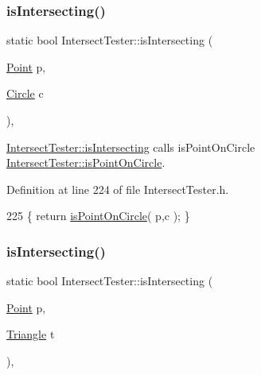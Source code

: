 \subsubsection{\texorpdfstring{is\+Intersecting()}{isIntersecting()}\hspace{0.1cm}{\footnotesize\ttfamily [3/15]}}
{\footnotesize\ttfamily static bool Intersect\+Tester\+::is\+Intersecting (\begin{DoxyParamCaption}\item[{\hyperlink{class_point}{Point}}]{p,  }\item[{\hyperlink{class_circle}{Circle}}]{c }\end{DoxyParamCaption})\hspace{0.3cm}{\ttfamily [inline]}, {\ttfamily [static]}}



\hyperlink{class_intersect_tester_a7710e17ff7d2e229059f23b9429213f5}{Intersect\+Tester\+::is\+Intersecting} calls is\+Point\+On\+Circle  \hyperlink{class_intersect_tester_a1adb6abbf2f6454b48be18cf5eb69333}{Intersect\+Tester\+::is\+Point\+On\+Circle}. 



Definition at line 224 of file Intersect\+Tester.\+h.


\begin{DoxyCode}
225     \{ \textcolor{keywordflow}{return} \hyperlink{class_intersect_tester_a1adb6abbf2f6454b48be18cf5eb69333}{isPointOnCircle}( p,c ); \}
\end{DoxyCode}
\mbox{\label{class_intersect_tester_afd66862467239ef2fd7c79114c960dc6}} 
\subsubsection{\texorpdfstring{is\+Intersecting()}{isIntersecting()}\hspace{0.1cm}{\footnotesize\ttfamily [4/15]}}
{\footnotesize\ttfamily static bool Intersect\+Tester\+::is\+Intersecting (\begin{DoxyParamCaption}\item[{\hyperlink{class_point}{Point}}]{p,  }\item[{\hyperlink{class_triangle}{Triangle}}]{t }\end{DoxyParamCaption})\hspace{0.3cm}{\ttfamily [inline]}, {\ttfamily [static]}}



